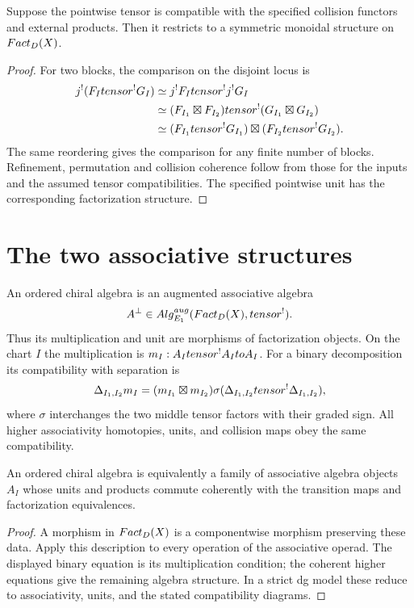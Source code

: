 \begin{proposition}
Suppose the pointwise tensor is compatible with the specified collision functors
and external products. Then it restricts to a symmetric monoidal structure on
$Fact_D(X)$.
\end{proposition}
\begin{proof}
For two blocks, the comparison on the disjoint locus is
\[
\begin{aligned}
 j^!(F_Itensor^!G_I)
 &\simeq j^!F_Itensor^!j^!G_I\\
 &\simeq(F_{I_1}\boxtimes F_{I_2})tensor^!
        (G_{I_1}\boxtimes G_{I_2})\\
 &\simeq(F_{I_1}tensor^!G_{I_1})\boxtimes
        (F_{I_2}tensor^!G_{I_2}).
\end{aligned}
\]
The same reordering gives the comparison for any finite number of blocks.
Refinement, permutation and collision coherence follow from those for the inputs
and the assumed tensor compatibilities. The specified pointwise unit has the
corresponding factorization structure.
\end{proof}

\section{The two associative structures}
\begin{definition}
An ordered chiral algebra is an augmented associative algebra
\[
 A^\perp\in Alg_{E_1}^{aug}(Fact_D(X),tensor^!).
\]
Thus its multiplication and unit are morphisms of factorization objects.
On the chart $I$ the multiplication is
$m_I:A_Itensor^!A_Ito A_I$.
For a binary decomposition its compatibility with separation is
\[
 \Delta_{I_1,I_2}m_I
 =(m_{I_1}\boxtimes m_{I_2})\sigma
   (\Delta_{I_1,I_2}tensor^!\Delta_{I_1,I_2}),
\]
where $\sigma$ interchanges the two middle tensor factors with their graded sign.
All higher associativity homotopies, units, and collision maps obey the same compatibility.
\end{definition}

\begin{proposition}
An ordered chiral algebra is equivalently a family of associative algebra objects
$A_I$ whose units and products commute coherently with the transition maps and
factorization equivalences.
\end{proposition}
\begin{proof}
A morphism in $Fact_D(X)$ is a componentwise morphism preserving these data.
Apply this description to every operation of the associative operad.
The displayed binary equation is its multiplication condition; the coherent
higher equations give the remaining algebra structure. In a strict dg model
these reduce to associativity, units, and the stated compatibility diagrams.
\end{proof}

